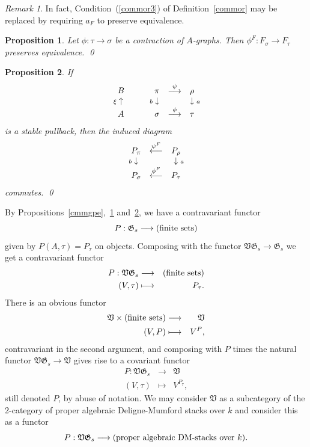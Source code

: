 \documentclass[11pt]{amsart}
\newtheorem{prop}{Proposition}[section]
\theoremstyle{definition}
\theoremstyle{remark}
\newtheorem{rmk}{Remark}\renewcommand{\thermk}{}
\newcommand{\rtext}[1]{\text{\upshape #1}}
\newcommand{\GG}{{\mathfrak{G}}}
\newcommand{\VV}{{\mathfrak{V}}}
\newcommand{\ldiag}[1]
       {\makebox[0cm]{\({\scriptstyle#1}\downarrow\phantom{\scriptstyle#1}\)}}
\newcommand{\ldiagup}[1]
       {\makebox[0cm]{\({\scriptstyle#1}\uparrow\phantom{\scriptstyle#1}\)}}
\newcommand{\rdiag}[1]
       {\makebox[0cm]{\(\phantom{\scriptstyle#1}\downarrow{\scriptstyle#1}\)}}
\newcommand{\comdiaback}[9]{
\begin{array}{ccc}
#1 & \stackrel{#2}{\longleftarrow} & #3 \\
\ldiag{#4} & #5 & \rdiag{#6} \\
#7 & \stackrel{#8}{\longleftarrow} & #9
\end{array}}
\renewcommand{\t}{_{\tau}}
\newcommand{\s}{_{\sigma}}
\theoremstyle{plain}
\theoremstyle{definition}
\theoremstyle{remark}
\begin{document}
\begin{rmk}
In fact, Condition~(\ref{commor3}) of Definition~\ref{commor} may be replaced
by requiring \(a_F\) to preserve
equivalence.
\end{rmk}

\begin{prop} \label{dafpea}
Let \(\phi:\tau\rightarrow\sigma\) be a contraction of \(A\)-graphs. Then
\(\phi^F:F\s\rightarrow F\t\) preserves equivalence.
\qed
\end{prop}

\begin{prop} \label{dpc}
If
\[
\begin{array}{ccccc}
B & & \pi & \stackrel{\psi}{\longrightarrow} & \rho \\
\ldiagup{\xi} & \phantom{\longrightarrow} & \ldiag{b} &  & \rdiag{a} \\
A & & \sigma & \stackrel{\phi}{\longrightarrow} & \tau
\end{array}
\]
is a stable pullback, then the induced diagram
\[
\comdiaback{P_\pi}{\psi^F}{P_\rho}{b}{}{a}{P\s}{\phi^F}{P\t}
\]
commutes. \qed
\end{prop}

By Propositions~\ref{cmmgpe},~\ref{dafpea} and~\ref{dpc}, we have a
contravariant functor
\[
P:\GG_s\longrightarrow(\rtext{finite sets})
\]
given by \(P(A,\tau)=P\t\) on objects. Composing with the functor
\(\VV\GG_s\rightarrow\GG_s\) we get a contravariant
functor
\begin{eqnarray*}
P:\VV\GG_s & \longrightarrow & (\rtext{finite sets}) \\
(V,\tau)   & \longmapsto     & P\t.
\end{eqnarray*}
There is an obvious functor
\begin{eqnarray*}
\VV\times(\rtext{finite sets}) & \longrightarrow & \VV \\
(V,P)                          & \longmapsto     & V^P,
\end{eqnarray*}
contravariant in the second argument, and composing with \(P\) times the natural
functor \(\VV\GG_s\rightarrow\VV\) gives
rise to a covariant functor
\begin{eqnarray*}
P:\VV\GG_s & \longrightarrow & \VV \\
(V,\tau)   & \longmapsto     & V^{P\t},
\end{eqnarray*}
still denoted \(P\), by abuse of notation. We may consider \(\VV\) as a subcategory
of the 2-category of proper algebraic
Deligne-Mumford stacks over \(k\) and consider this as a functor
\[
P:\VV\GG_s\longrightarrow(\rtext{proper algebraic DM-stacks over \(k\)}).
\]
\end{document}
